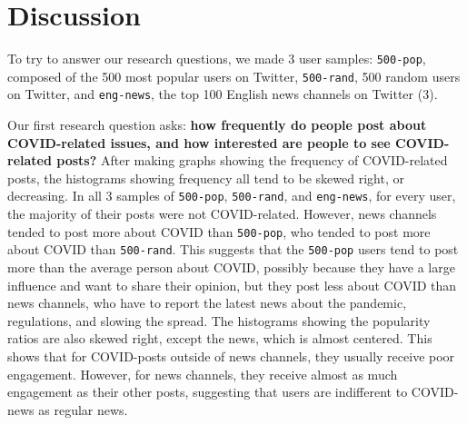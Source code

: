 \documentclass{article}
\begin{document}
    \section{Discussion}
    \indent

    To try to answer our research questions, we made 3 user samples: \texttt{500-pop}, composed of the 500 most popular users on Twitter, \texttt{500-rand}, 500 random users on Twitter, and \texttt{eng-news}, the top 100 English news channels on Twitter (3).

    Our first research question asks: \textbf{how frequently do people post about COVID-related issues, and how interested are people to see COVID-related posts?}
    After making graphs showing the frequency of COVID-related posts, the histograms showing frequency all tend to be skewed right, or decreasing. In all 3 samples of \texttt{500-pop}, \texttt{500-rand}, and \texttt{eng-news}, for every user, the majority of their posts were not COVID-related. However, news channels tended to post more about COVID than \texttt{500-pop}, who tended to post more about COVID than \texttt{500-rand}. This suggests that the \texttt{500-pop} users tend to post more than the average person about COVID, possibly because they have a large influence and want to share their opinion, but they post less about COVID than news channels, who have to report the latest news about the pandemic, regulations, and slowing the spread.
    The histograms showing the popularity ratios are also skewed right, except the news, which is almost centered. This shows that for COVID-posts outside of news channels, they usually receive poor engagement. However, for news channels, they receive almost as much engagement as their other posts, suggesting that users are indifferent to COVID-news as regular news.
    
\end{document}
